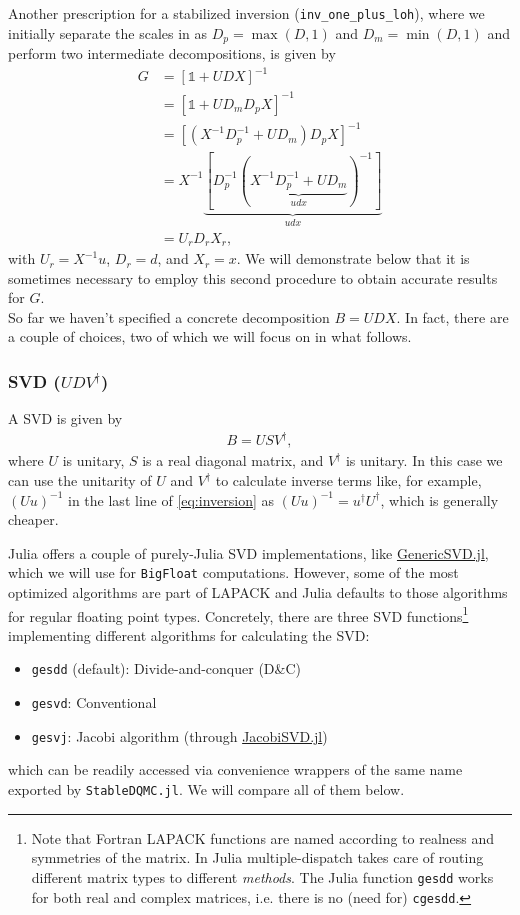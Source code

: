 \documentclass[%
 reprint,
superscriptaddress,
citeautoscript,
showpacs,
 amsmath,amssymb,
 aps,
 prb,
longbibliography,
]{revtex4-2}
\begin{document}
Another prescription for a stabilized inversion (\texttt{inv\_one\_plus\_loh}), where we initially separate the scales in as $D_p = \max(D, 1)$ and $D_m = \min(D, 1)$ and perform two intermediate decompositions, is given by \cite{Loh2005, Loh1989}
\begin{align}
	G &= [\mathbb{1} + UDX]^{-1} \nonumber\\
	&= [\mathbb{1} + UD_mD_pX]^{-1} \nonumber\\
	&= [(X^{-1} D_p^{-1} + U D_m) D_p X]^{-1} \label{eq:inversion_loh} \\
	&= X^{-1} \underbrace{[D_p^{-1} (\underbrace{X^{-1} D_p^{-1} + UD_m}_{udx})^{-1}]}_{udx} \nonumber \\
	&= U_r D_r X_r, \nonumber
\end{align}
with $U_r = X^{-1}u$, $D_r = d$, and $X_r = x$. We will demonstrate below that it is sometimes necessary to employ this second procedure to obtain accurate results for $G$.\\

So far we haven't specified a concrete decomposition ${B = UDX}$. In fact, there are a couple of choices, two of which we will focus on in what follows.

\subsubsection{SVD ($UDV^\dagger$)}
A SVD is given by
\begin{align}
	B = USV^\dagger,
\end{align}
where $U$ is unitary, $S$ is a real diagonal matrix, and $V^\dagger$ is unitary. In this case we can use the unitarity of $U$ and $V^\dagger$ to calculate inverse terms like, for example, $(Uu)^{-1}$ in the last line of \ref{eq:inversion} as $(Uu)^{-1} = u^\dagger U^\dagger$, which is generally cheaper.

Julia offers a couple of purely-Julia SVD implementations, like \href{https://github.com/JuliaLinearAlgebra/GenericSVD.jl/}{GenericSVD.jl}, which we will use for \texttt{BigFloat} computations. However, some of the most optimized algorithms are part of LAPACK \cite{LAPACK} and Julia defaults to those algorithms for regular floating point types. Concretely, there are three SVD functions\footnote{Note that Fortran LAPACK functions are named according to realness and symmetries of the matrix. In Julia multiple-dispatch takes care of routing different matrix types to different \textit{methods}. The Julia function \texttt{gesdd} works for both real and complex matrices, i.e. there is no (need for) \texttt{cgesdd}.} implementing different algorithms for calculating the SVD:
\begin{itemize}
	\item \texttt{gesdd} (default): Divide-and-conquer (D\&C)
	\item \texttt{gesvd}: Conventional
	\item \texttt{gesvj}: Jacobi algorithm (through \href{https://github.com/RalphAS/JacobiSVD.jl}{JacobiSVD.jl})
\end{itemize}
which can be readily accessed via convenience wrappers of the same name exported by \texttt{StableDQMC.jl}. We will compare all of them below.
\end{document}
